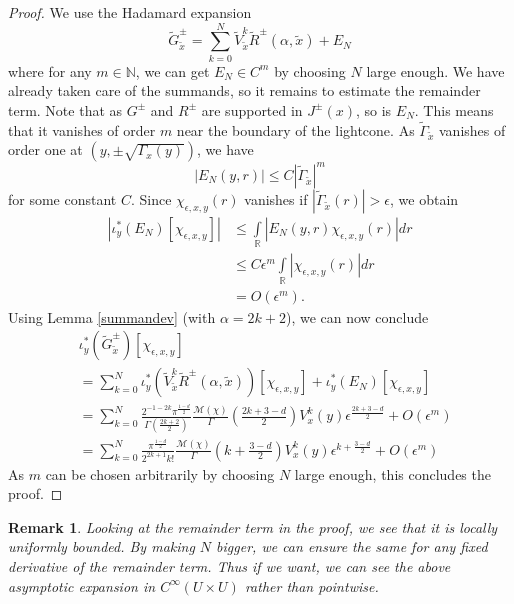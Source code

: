 \documentclass[11pt]{article}
\def\R{{\mathbb{R}}}
\def\N{{\mathbb{N}}}
\def\intR{\int\limits_\R}
\def\M{\mathcal{M}}
\newtheorem{rem}[df]{Remark}
\begin{document}
\begin{proof}
	We use the Hadamard expansion
	\[\tilde G^\pm_{\tilde x}=\sum\limits_{k=0}^N\tilde V^k_{\tilde x}\tilde R^\pm(\alpha,{\tilde x})+E_N\]
	where for any $m\in \N$, we can get $E_N\in C^m$ by choosing $N$ large enough. We have already taken care of the summands, so it remains to estimate the remainder term. Note that as $G^\pm$ and $R^\pm$ are supported in $J^\pm(x)$, so is $E_N$. This means that it vanishes of order $m$ near the boundary of the lightcone. As $\tilde\Gamma_{\tilde x}$ vanishes of order one at $(y,\pm\sqrt{\Gamma_x(y)})$, we have
	\[|E_N(y,r)|\leq C|\tilde \Gamma_{\tilde x}|^m\]
	for some constant $C$.
	Since $\chi_{\epsilon,x,y}(r)$ vanishes if $|\tilde\Gamma_{\tilde x}(r)|>\epsilon$, we obtain
	\begin{align*}
		|\iota_y^*(E_N)[\chi_{\epsilon,x,y}]|&\leq\intR |E_N(y,r) \chi_{\epsilon,x,y}(r)| dr\\
		&\leq C\epsilon^m\intR|\chi_{\epsilon,x,y}(r)| dr\\
		&=O(\epsilon^m).
	\end{align*}
	Using Lemma \ref{summandev} (with $\alpha=2k+2$), we can now conclude
	\begin{align*}
		&\iota_y^*(\tilde G^\pm_{\tilde x})[\chi_{\epsilon,x,y}]\\
		&=\sum\limits_{k=0}^N\iota_y^*(\tilde V^k_{\tilde x}\tilde R^\pm(\alpha,{\tilde x}))[\chi_{\epsilon,x,y}]+\iota_y^*(E_N)[\chi_{\epsilon,x,y}]\\
		&=\sum\limits_{k=0}^N\frac{2^{-1-2k}\pi^{\tfrac{1-d}{2}}}{\Gamma(\frac{2k+2}{2})}\frac{\M(\chi)}{\Gamma}(\tfrac{2k+3-d}{2})V^k_x(y)\epsilon^{\tfrac{2k+3-d}{2}}+O(\epsilon^m)\\
		&=\sum\limits_{k=0}^N\frac{\pi^{\tfrac{1-d}{2}}}{2^{2k+1}k!}\frac{\M(\chi)}{\Gamma}(k+\tfrac{3-d}{2})V^k_x(y)\epsilon^{k+\tfrac{3-d}{2}}+O(\epsilon^m)
	\end{align*}
	As $m$ can be chosen arbitrarily by choosing $N$ large enough, this concludes the proof.
\end{proof}
\begin{rem}
	Looking at the remainder term in the proof, we see that it is locally uniformly bounded. By making $N$ bigger, we can ensure the same for any fixed derivative of the remainder term. Thus if we want, we can see the above asymptotic expansion in $C^\infty(U\times U)$ rather than pointwise.
\end{rem}
\end{document}
